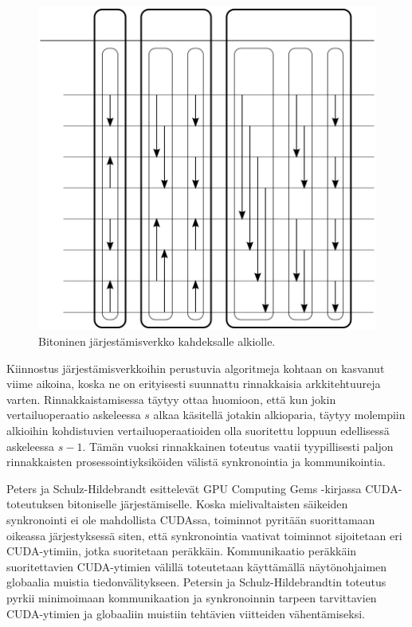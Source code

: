 \documentclass[a4paper,11pt]{article}
\begin{document}
\begin{figure}
\centering
\includegraphics[scale = 0.8]{bitonic}
\caption{Bitoninen järjestämisverkko kahdeksalle alkiolle.}
\label{fig:bitonicsort}
\end{figure}

Kiinnostus järjestämisverkkoihin perustuvia algoritmeja kohtaan on kasvanut viime aikoina, koska ne on erityisesti suunnattu rinnakkaisia arkkitehtuureja varten. Rinnakkaistamisessa täytyy ottaa huomioon, että kun jokin vertailuoperaatio askeleessa $s$ alkaa käsitellä jotakin alkioparia, täytyy molempiin alkioihin kohdistuvien vertailuoperaatioiden olla suoritettu loppuun edellisessä askeleessa $s - 1$. Tämän vuoksi rinnakkainen toteutus vaatii tyypillisesti paljon rinnakkaisten prosessointiyksiköiden välistä synkronointia ja kommunikointia.

Peters ja Schulz-Hildebrandt \cite{peters2012gems} esittelevät GPU Computing Gems -kirjassa CUDA-toteutuksen bitoniselle järjestämiselle. Koska mielivaltaisten säikeiden synkronointi ei ole mahdollista CUDAssa, toiminnot pyritään suorittamaan oikeassa järjestyksessä siten, että synkronointia vaativat toiminnot sijoitetaan eri CUDA-ytimiin, jotka suoritetaan peräkkäin. Kommunikaatio peräkkäin suoritettavien CUDA-ytimien välillä toteutetaan käyttämällä näytönohjaimen globaalia muistia tiedonvälitykseen. Petersin ja Schulz-Hildebrandtin toteutus pyrkii minimoimaan kommunikaation ja synkronoinnin tarpeen tarvittavien CUDA-ytimien ja globaaliin muistiin tehtävien viitteiden vähentämiseksi.
\end{document}
